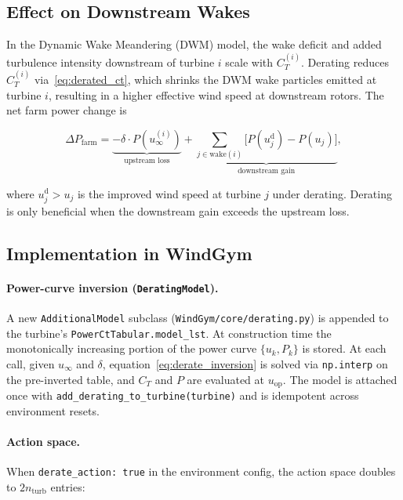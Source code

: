 \subsection{Effect on Downstream Wakes}

In the Dynamic Wake Meandering (DWM) model, the wake deficit and added turbulence
intensity downstream of turbine $i$ scale with $C_T^{(i)}$.
Derating reduces $C_T^{(i)}$ via~\eqref{eq:derated_ct}, which shrinks the DWM wake
particles emitted at turbine $i$, resulting in a higher effective wind speed at
downstream rotors.
The net farm power change is

\begin{equation}
    \Delta P_\text{farm} = \underbrace{-\delta \cdot P(u_\infty^{(i)})}_{\text{upstream loss}}
    + \underbrace{\sum_{j \in \text{wake}(i)} \bigl[P(u_j^\text{d}) - P(u_j)\bigr]}_{\text{downstream gain}},
\end{equation}

where $u_j^\text{d} > u_j$ is the improved wind speed at turbine $j$ under derating.
Derating is only beneficial when the downstream gain exceeds the upstream loss.

\subsection{Implementation in WindGym}

\paragraph{Power-curve inversion (\texttt{DeratingModel}).}
A new \texttt{AdditionalModel} subclass (\texttt{WindGym/core/derating.py}) is appended
to the turbine's \texttt{PowerCtTabular.model\_lst}.
At construction time the monotonically increasing portion of the power curve
$\{u_k, P_k\}$ is stored.
At each call, given $u_\infty$ and $\delta$, equation~\eqref{eq:derate_inversion} is
solved via \texttt{np.interp} on the pre-inverted table, and $C_T$ and $P$ are
evaluated at $u_\text{op}$.
The model is attached once with \texttt{add\_derating\_to\_turbine(turbine)} and is
idempotent across environment resets.

\paragraph{Action space.}
When \texttt{derate\_action: true} in the environment config, the action space doubles
to $2n_\text{turb}$ entries:

